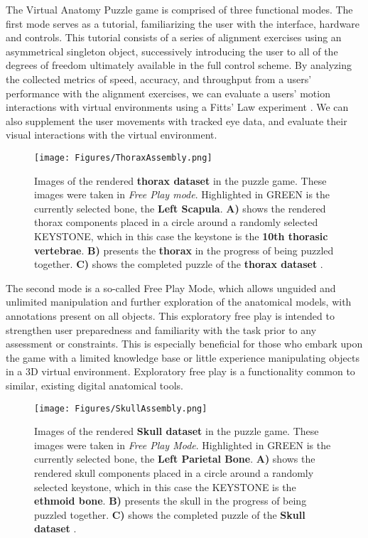 \documentclass[]{spie}  %
\begin{document}
The Virtual Anatomy Puzzle game is comprised of three functional modes. The first mode serves as a tutorial, familiarizing the user with the interface, hardware and controls. This tutorial consists of a series of alignment exercises using an asymmetrical singleton object, successively introducing the user to all of the degrees of freedom ultimately available in the full control scheme. By analyzing the collected metrics of speed, accuracy, and throughput from a users’ performance with the alignment exercises, we can evaluate a users’ motion interactions with virtual environments using a Fitts’ Law experiment \cite{raynal2013towards}. We can also supplement the user movements with tracked eye data, and evaluate their visual interactions with the virtual environment. 

\begin{figure}[htb]
      \centering
      \texttt{[image: Figures/ThoraxAssembly.png]}
      \caption{Images of the rendered \textbf{thorax dataset} in the puzzle game. These images were taken in \textit{Free Play mode}. Highlighted in GREEN is the currently selected bone, the \textbf{Left Scapula}. \textbf{A)} shows the rendered thorax components placed in a circle around a randomly selected KEYSTONE, which in this case the keystone is the \textbf{10th thorasic vertebrae}. \textbf{B)} presents the \textbf{thorax} in the progress of being puzzled together. \textbf{C)} shows the completed puzzle of the \textbf{thorax dataset} \cite{messier2016interactive}.}
      \label{fig:Thorax}
\end{figure}

The second mode is a so-called Free Play Mode, which allows unguided and unlimited manipulation and further exploration of the anatomical models, with annotations present on all objects. This exploratory free play is intended to strengthen user preparedness and familiarity with the task prior to any assessment or constraints. This is especially beneficial for those who embark upon the game with a limited knowledge base or little experience manipulating objects in a 3D virtual environment. Exploratory free play is a functionality common to similar, existing digital anatomical tools. 

\begin{figure}[htb]
      \centering
      \texttt{[image: Figures/SkullAssembly.png]}
      \caption{Images of the rendered \textbf{Skull dataset} in the puzzle game. These images were taken in \textit{Free Play Mode}. Highlighted in GREEN is the currently selected bone, the \textbf{Left Parietal Bone}. \textbf{A)} shows the rendered skull components placed in a circle around a randomly selected keystone, which in this case the KEYSTONE is the \textbf{ethmoid bone}. \textbf{B)} presents the skull in the progress of being puzzled together. \textbf{C)} shows the completed puzzle of the \textbf{Skull dataset} \cite{messier2016interactive}.}
      \label{fig:Skull}
\end{figure}
\end{document}
